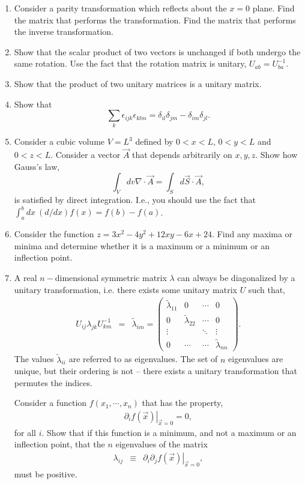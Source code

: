 \begin{enumerate}
\begin{comment}
\end{comment}

\item Consider a parity transformation which reflects about the $x=0$ plane. Find the matrix that performs the transformation. Find the matrix that performs the inverse transformation.

\item Show that the scalar product of two vectors is unchanged if both undergo the same rotation. Use the fact that the rotation matrix is unitary, $U_{ab}=U^{-1}_{ba}$.

\item Show that the product of two unitary matrices is a unitary matrix. 

\item Show that
\[
\sum_k\epsilon_{ijk}\epsilon_{klm}=\delta_{il}\delta_{jm}-\delta_{im}\delta_{jl}.
\]

\item Consider a cubic volume $V=L^3$ defined by $0<x<L$, $0<y<L$ and $0<z<L$. Consider a vector $\vec{A}$ that depends arbitrarily on $x,y,z$. Show how Gauss's law,
\[
\int_V dv\nabla\cdot\vec{A}=\int_Sd\vec{S}\cdot\vec{A},
\]
is satisfied by direct integration. I.e., you should use the fact that $\int_a^b dx~(d/dx)f(x)=f(b)-f(a)$.

\item Consider the function $z=3x^2-4y^2+12xy-6x+24$. Find any maxima or minima and determine whether it is a maximum or a minimum or an inflection point.

\item A real $n-$dimensional symmetric matrix $\lambda$ can always be diagonalized by a unitary transformation, i.e. there exists some unitary matrix $U$ such that,
\begin{eqnarray}
U_{ij}\lambda_{jk}U^{-1}_{km}&=&\tilde{\lambda}_{im}=\left(\begin{array}{cccc}
\tilde{\lambda}_{11}&0&\cdots&0\\
0&\tilde{\lambda}_{22}&\cdots&0\\
\vdots& & \ddots & \vdots\\
0& \cdots &\cdots &\tilde{\lambda}_{nn}
\end{array}\right).
\end{eqnarray}
The values $\tilde{\lambda}_{ii}$ are referred to as eigenvalues. The set of $n$ eigenvalues are unique, but their ordering is not -- there exists a unitary transformation that permutes the indices. 

Consider a function $f(x_1,\cdots,x_n)$ that has the property,
\begin{eqnarray}
\left.\partial_i f(\vec{x})\right|_{\vec{x}=0}=0,
\end{eqnarray}
for all $i$. Show that if this function is a minimum, and not a maximum or an inflection point, that the $n$ eigenvalues of the matrix
\begin{eqnarray}
\lambda_{ij}&\equiv&\left.\partial_i\partial_j f(\vec{x})\right|_{\vec{x}=0},
\end{eqnarray}
must be positive.


\end{enumerate}
